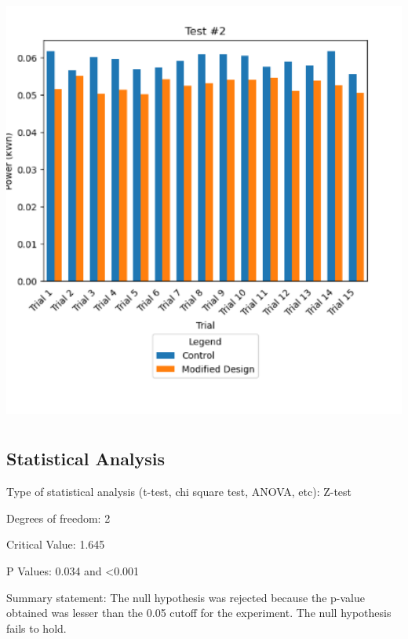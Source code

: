 \includegraphics[width=5.40983in,height=5.57687in]{media/image11.png}

\subsection{Statistical Analysis}\label{statistical-analysis}

Type of statistical analysis (t-test, chi square test, ANOVA, etc):
Z-test

Degrees of freedom: 2

Critical Value: 1.645

P Values: 0.034 and \textless0.001

Summary statement: The null hypothesis was rejected because the p-value
obtained was lesser than the 0.05 cutoff for the experiment. The null
hypothesis fails to hold.


